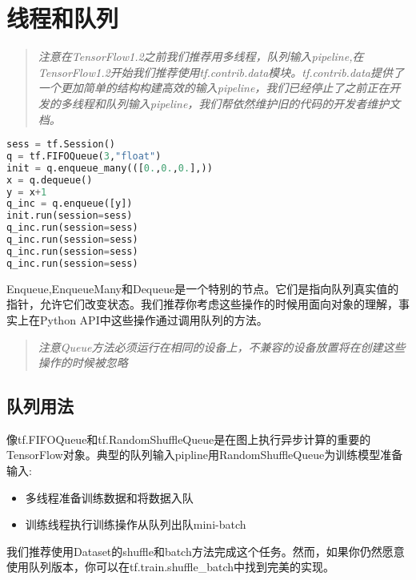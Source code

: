 \section{线程和队列}
\begin{quote}
	\emph{注意在TensorFlow1.2之前我们推荐用多线程，队列输入pipeline,在TensorFlow1.2开始我们推荐使用tf.contrib.data模块。tf.contrib.data提供了一个更加简单的结构构建高效的输入pipeline，我们已经停止了之前正在开发的多线程和队列输入pipeline，我们帮依然维护旧的代码的开发者维护文档。}
\end{quote}
\begin{lstlisting}[language=Python]
sess = tf.Session()
q = tf.FIFOQueue(3,"float")
init = q.enqueue_many(([0.,0.,0.],))
x = q.dequeue()
y = x+1
q_inc = q.enqueue([y])
init.run(session=sess)
q_inc.run(session=sess)
q_inc.run(session=sess)
q_inc.run(session=sess)
q_inc.run(session=sess)
\end{lstlisting}
Enqueue,EnqueueMany和Dequeue是一个特别的节点。它们是指向队列真实值的指针，允许它们改变状态。我们推荐你考虑这些操作的时候用面向对象的理解，事实上在Python API中这些操作通过调用队列的方法。
\begin{quote}
	\emph{注意Queue方法必须运行在相同的设备上，不兼容的设备放置将在创建这些操作的时候被忽略}
\end{quote}
\subsection{队列用法}
像tf.FIFOQueue和tf.RandomShuffleQueue是在图上执行异步计算的重要的TensorFlow对象。典型的队列输入pipline用RandomShuffleQueue为训练模型准备输入:
\begin{itemize}
	\item 多线程准备训练数据和将数据入队
	\item 训练线程执行训练操作从队列出队mini-batch
\end{itemize}
我们推荐使用Dataset的shuffle和batch方法完成这个任务。然而，如果你仍然愿意使用队列版本，你可以在tf.train.shuffle\_batch中找到完美的实现。


